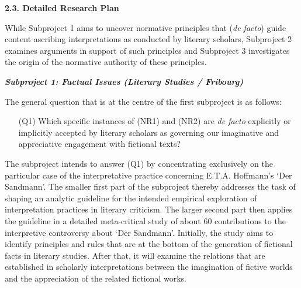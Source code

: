 \noindent\textbf{\large 2.3. Detailed Research Plan}

\noindent While Subproject 1 aims to uncover normative principles that (\emph{de facto}) guide content ascribing interpretations as conducted by literary scholars, Subproject 2 examines arguments in support of such principles and Subproject 3 investigates the origin of the normative authority of these principles.


\vspace{.2cm}
\noindent\textbf{\emph{Subproject 1: Factual Issues (Literary Studies / Fribourg)}}
\vspace{.1cm}

The general question that is at the centre of the first subproject is as follows:

\vspace{-.1cm}
\begin{itemize}[leftmargin=2cm]
\item[(Q1)] Which specific instances of (NR1) and (NR2) are \emph{de facto} explicitly or implicitly accepted by literary scholars as governing our imaginative and appreciative engagement with fictional texts?
\end{itemize}
\vspace{-.1cm}


\noindent The subproject intends to answer (Q1) by concentrating exclusively on the particular case of the interpretative practice concerning E.T.A. Hoffmann's `Der Sandmann'. The smaller first part of the subproject thereby addresses the task of shaping an analytic guideline for the intended empirical exploration of interpretation practices in literary criticism. The larger second part then applies the guideline in a detailed meta-critical study of about 60 contributions to the interpretive controversy about `Der Sandmann'. Initially, the study aims to identify principles and rules that are at the bottom of the generation of fictional facts in literary studies. After that, it will examine the relations that are established in scholarly interpretations between the imagination of fictive worlds and the appreciation of the related fictional works.


